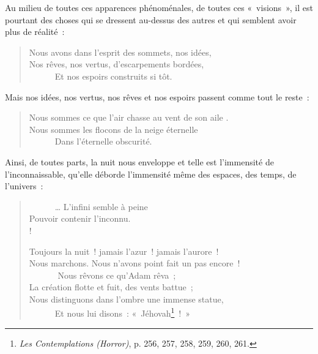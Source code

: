 \documentclass[french,twoside]{book} %
\begin{document}
\noindent Au milieu de toutes ces apparences phénoménales, de toutes ces « visions », il est pourtant des choses qui se dressent au-dessus des autres et qui semblent avoir plus de réalité :\par


\begin{verse}
Nous avons dans l’esprit des sommets, nos idées,\\
Nos rêves, nos vertus, d’escarpements bordées,\\
      Et nos espoirs construits si tôt.\\
\end{verse}

\noindent Mais nos idées, nos vertus, nos rêves et nos espoirs passent comme tout le reste :\par


\begin{verse}
Nous sommes ce que l’air chasse au vent de son aile .\\
Nous sommes les flocons de la neige éternelle\\
      Dans l’éternelle obscurité.\\
\end{verse}

\noindent Ainsi, de toutes parts, la nuit nous enveloppe et telle est l’immensité de l’inconnaissable, qu’elle déborde l’immensité même des espaces, des temps, de l’univers :\par


\begin{verse}
      … L’infini semble à peine\\
Pouvoir contenir l’inconnu.\\!

Toujours la nuit ! jamais l’azur ! jamais l’aurore !\\
Nous marchons. Nous n’avons point fait un pas encore !\\
       Nous rêvons ce qu’Adam rêva ;\\
La création flotte et fuit, des vents battue ;\\
Nous distinguons dans l’ombre une immense statue,\\
      Et nous lui disons : « Jéhovah\footnote{\emph{Les Contemplations (Horror)}, p. 256, 257, 258, 259, 260, 261.} ! »\\
\end{verse}
\end{document}
